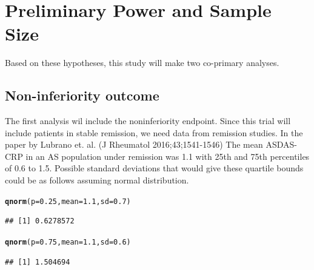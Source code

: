 \documentclass{article}\usepackage[]{graphicx}\usepackage[]{color}
\makeatletter
\newcommand{\hlnum}[1]{\textcolor[rgb]{0.686,0.059,0.569}{#1}}%
\newcommand{\hlstd}[1]{\textcolor[rgb]{0.345,0.345,0.345}{#1}}%
\newcommand{\hlkwc}[1]{\textcolor[rgb]{0.333,0.667,0.333}{#1}}%
\newcommand{\hlkwd}[1]{\textcolor[rgb]{0.737,0.353,0.396}{\textbf{#1}}}%
\newenvironment{kframe}{%
 \def\at@end@of@kframe{}%
 \ifinner\ifhmode%
  \def\at@end@of@kframe{\end{minipage}}%
  \begin{minipage}{\columnwidth}%
 \fi\fi%
 \def\FrameCommand##1{\hskip\@totalleftmargin \hskip-\fboxsep
 \colorbox{shadecolor}{##1}\hskip-\fboxsep
     \hskip-\linewidth \hskip-\@totalleftmargin \hskip\columnwidth}%
 \MakeFramed {\advance\hsize-\width
   \@totalleftmargin\z@ \linewidth\hsize
   \@setminipage}}%
 {\par\unskip\endMakeFramed%
 \at@end@of@kframe}
\newenvironment{knitrout}{}{} %
\makeatother
\begin{document}
\section{Preliminary Power and Sample Size}

Based on these hypotheses, this study will make two co-primary analyses.

\subsection{Non-inferiority outcome}

The first analysis wil include the noninferiority endpoint. Since this trial will include patients in stable remission, we need data from remission studies. In the paper by Lubrano et. al. (J Rheumatol 2016;43;1541-1546) The mean ASDAS-CRP in an AS population under remission was 1.1 with 25th and 75th percentiles of 0.6 to 1.5. Possible standard deviations that would give these quartile bounds could be as follows assuming normal distribution.

\begin{knitrout}
\color{fgcolor}\begin{kframe}
\begin{alltt}
\hlkwd{qnorm}\hlstd{(}\hlkwc{p}\hlstd{=}\hlnum{0.25}\hlstd{,}\hlkwc{mean}\hlstd{=}\hlnum{1.1}\hlstd{,} \hlkwc{sd}\hlstd{=}\hlnum{0.7}\hlstd{)}
\end{alltt}
\begin{verbatim}
## [1] 0.6278572
\end{verbatim}
\begin{alltt}
\hlkwd{qnorm}\hlstd{(}\hlkwc{p}\hlstd{=}\hlnum{0.75}\hlstd{,}\hlkwc{mean}\hlstd{=}\hlnum{1.1}\hlstd{,} \hlkwc{sd}\hlstd{=}\hlnum{0.6}\hlstd{)}
\end{alltt}
\begin{verbatim}
## [1] 1.504694
\end{verbatim}
\end{kframe}
\end{knitrout}
\end{document}
